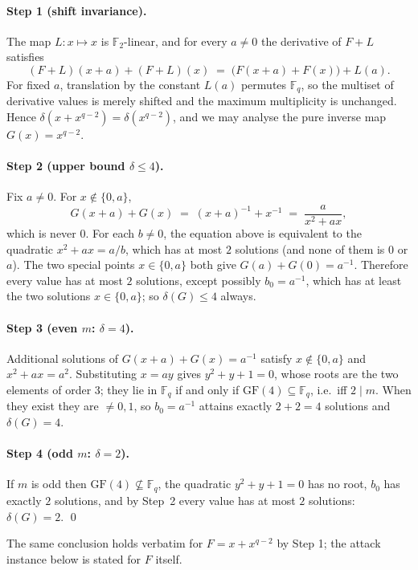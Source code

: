 \documentclass[11pt]{article}
\newcommand{\F}{\mathbb{F}}
\newcommand{\GF}{\mathrm{GF}}
\newcommand{\duni}{\delta}
\begin{document}
\paragraph{Step 1 (shift invariance).}
The map $L \colon x \mapsto x$ is $\F_2$-linear, and for every $a \neq 0$ the
derivative of $F + L$ satisfies
\[
(F+L)(x+a) + (F+L)(x) \;=\; \bigl(F(x+a) + F(x)\bigr) + L(a).
\]
For fixed $a$, translation by the constant $L(a)$ permutes $\F_q$, so the
multiset of derivative values is merely shifted and the maximum multiplicity
is unchanged.  Hence
$\duni(x + x^{q-2}) = \duni(x^{q-2})$, and we may analyse the pure inverse
map $G(x) = x^{q-2}$.

\paragraph{Step 2 (upper bound $\duni \leq 4$).}
Fix $a \neq 0$.  For $x \notin \{0, a\}$,
\[
G(x+a) + G(x) \;=\; (x+a)^{-1} + x^{-1} \;=\; \frac{a}{x^2 + ax},
\]
which is never $0$.  For each $b \neq 0$, the equation above is equivalent to
the quadratic $x^2 + ax = a/b$, which has at most $2$ solutions (and none of
them is $0$ or $a$).  The two special points $x \in \{0, a\}$ both give
$G(a) + G(0) = a^{-1}$.  Therefore every value has at most $2$ solutions,
except possibly $b_0 = a^{-1}$, which has at least the two solutions
$x \in \{0, a\}$; so $\duni(G) \leq 4$ always.

\paragraph{Step 3 (even $m$: $\duni = 4$).}
Additional solutions of $G(x+a)+G(x) = a^{-1}$ satisfy $x \notin \{0,a\}$ and
$x^2 + ax = a^2$.  Substituting $x = ay$ gives $y^2 + y + 1 = 0$, whose roots
are the two elements of order $3$; they lie in $\F_q$ if and only if
$\GF(4) \subseteq \F_q$, i.e.\ iff $2 \mid m$.  When they exist they are
$\neq 0, 1$, so $b_0 = a^{-1}$ attains exactly $2 + 2 = 4$ solutions and
$\duni(G) = 4$.

\paragraph{Step 4 (odd $m$: $\duni = 2$).}
If $m$ is odd then $\GF(4) \not\subseteq \F_q$, the quadratic $y^2+y+1 = 0$
has no root, $b_0$ has exactly $2$ solutions, and by Step~2 every value has
at most $2$ solutions: $\duni(G) = 2$.
\qed

\begin{remark}
The same conclusion holds verbatim for $F = x + x^{q-2}$ by Step 1; the
attack instance below is stated for $F$ itself.
\end{remark}
\end{document}
